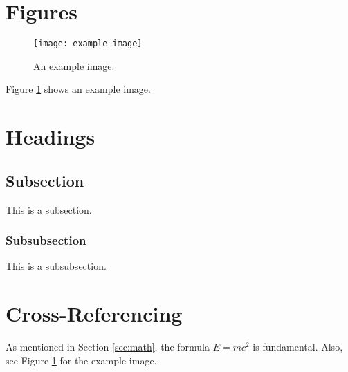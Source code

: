 \documentclass{article}
\begin{document}
\section{Figures}
\begin{figure}[h]
    \centering
    \texttt{[image: example-image]}
    \caption{An example image.}
    \label{fig:image}
\end{figure}

Figure \ref{fig:image} shows an example image.

\section{Headings}
\subsection{Subsection}
This is a subsection.

\subsubsection{Subsubsection}
This is a subsubsection.

\section{Cross-Referencing}
As mentioned in Section \ref{sec:math}, the formula $E=mc^2$ is fundamental.
Also, see Figure \ref{fig:image} for the example image.
\end{document}
